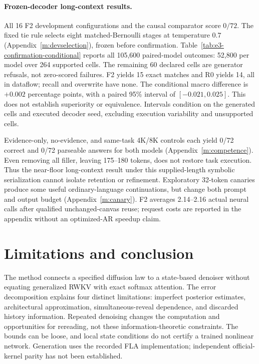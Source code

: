\documentclass{article}
\theoremstyle{remark}\newtheorem{remark}[theorem]{Remark}
\begin{document}
\paragraph{Frozen-decoder long-context results.}
All 16 F2 development configurations and the causal comparator score $0/72$. The fixed tie rule selects eight matched-Bernoulli stages at temperature $0.7$ (Appendix~\ref{m:devselection}), frozen before confirmation. Table~\ref{tab:e3-confirmation-conditional} reports all 105,600 paired-model outcomes: 52,800 per model over 264 supported cells. The remaining 60 declared cells are generator refusals, not zero-scored failures. F2 yields 15 exact matches and R0 yields 14, all in dataflow; recall and overwrite have none. The conditional macro difference is $+0.002$ percentage points, with a paired 95\% interval of $[-0.021,0.025]$. This does not establish superiority or equivalence. Intervals condition on the generated cells and executed decoder seed, excluding execution variability and unsupported cells.

Evidence-only, no-evidence, and same-task 4K/8K controls each yield 0/72 correct and 0/72 parseable answers for both models (Appendix~\ref{m:competence}). Even removing all filler, leaving 175--180 tokens, does not restore task execution. Thus the near-floor long-context result under this supplied-length symbolic serialization cannot isolate retention or refinement. Exploratory 32-token canaries produce some useful ordinary-language continuations, but change both prompt and output budget (Appendix~\ref{m:canary}). F2 averages 2.14--2.16 actual neural calls after qualified unchanged-canvas reuse; request costs are reported in the appendix without an optimized-AR speedup claim.



\section{Limitations and conclusion}
\label{m:conclusion}
The method connects a specified diffusion law to a state-based denoiser without equating generalized RWKV with exact softmax attention. The error decomposition explains four distinct limitations: imperfect posterior estimates, architectural approximation, simultaneous-reveal dependence, and discarded history information. Repeated denoising changes the computation and opportunities for rereading, not these information-theoretic constraints. The bounds can be loose, and local state conditions do not certify a trained nonlinear network. Generation uses the recorded FLA implementation; independent official-kernel parity has not been established.
\end{document}
